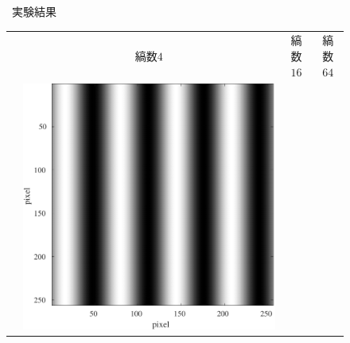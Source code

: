 \begin{figure}[H]
\begin{minipage}[b]{.23\textwidth}
    \end{minipage}
    \caption{\kadaibe\ 実験結果}
\end{figure}
\begin{figure}[H]
    \centering
    \renewcommand{\arraystretch}{1.5}
    \begin{tabularx}{\textwidth}{p{}CCC}
                                                                                                & {\small 縞数\(4\)} & {\small 縞数\(16\)} & {\small 縞数\(64\)} \\
        \begin{minipage}{.05\textwidth}
            \centering
        \end{minipage}                                                         &
        \begin{minipage}{.25\textwidth}
            \centering
            \includegraphics[width=.9\textwidth,keepaspectratio]{../../Figures/08_11_img4.pdf}
        \end{minipage}      &
        \begin{minipage}{.25\textwidth}
            \centering

\end{minipage}
\end{tabularx}
\end{figure}
